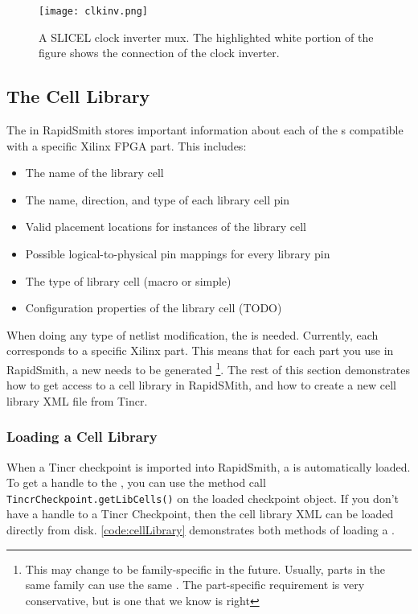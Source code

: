 \begin{itemize}
\begin{figure}[H]
 \centering
 \texttt{[image: clkinv.png]}
 \caption{A SLICEL clock inverter mux. The highlighted white portion of the
 figure shows the connection of the clock inverter.}
 \label{fig:clkinv}
\end{figure}
  
  
\end{itemize}

\subsection{The Cell Library}

The  in RapidSmith stores important information about each of
the s compatible with a specific Xilinx FPGA part.
This includes: 

\begin {itemize}
  \item The name of the library cell
  \item The name, direction, and type of each library cell pin
  \item Valid placement locations for instances of the library cell
  \item Possible logical-to-physical pin mappings for every library pin
  \item The type of library cell (macro or simple)
  \item Configuration properties of the library cell (TODO)
\end{itemize}

\noindent
When doing any type of netlist modification, the  is needed.
Currently, each  corresponds to a specific Xilinx
part.
This means that for each part you use in RapidSmith, a new 
needs to be generated \footnote{This may change to be family-specific in the
future. Usually, parts in the same family can use the same
. The part-specific requirement is very conservative, but is
one that we know is right}.
The rest of this section demonstrates how to get access to a cell library in
RapidSMith, and how to create a new cell library XML file from Tincr.

\subsubsection{Loading a Cell Library}
When a Tincr checkpoint is imported into RapidSmith, a  is
automatically loaded. To get a handle to the , you can use
the method call \texttt{TincrCheckpoint.getLibCells()} on the loaded checkpoint
object. If you don't have a handle to a Tincr Checkpoint, then the cell
library XML can be loaded directly from disk. \autoref{code:cellLibrary}
demonstrates both methods of loading a .

